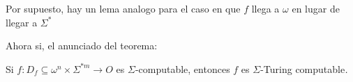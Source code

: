 \begin{frame}

Por supuesto, hay un lema analogo para el caso en que $f$ llega a $\omega $
en lugar de llegar a $\Sigma ^{\ast }$

\bigskip

Ahora si, el anunciado del teorema:

\begin{theorem}
Si $f:D_{f}\subseteq \omega ^{n}\times \Sigma ^{\ast m}\rightarrow O$ es $%
\Sigma $-computable, entonces $f$ es $\Sigma $-Turing computable\textit{.}
\end{theorem}
\end{frame}
